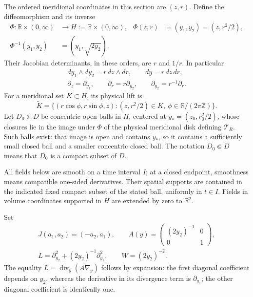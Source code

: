 The ordered meridional coordinates in this section are \((z,r)\).
Define the diffeomorphism and its inverse
\begin{align}
 \Phi:\mathbb R\times(0,\infty)&\longrightarrow
              H:=\mathbb R\times(0,\infty),
 &\Phi(z,r)&=(y_1,y_2)=(z,r^2/2),\label{eq:ec-Phi}\\
 \Phi^{-1}(y_1,y_2)&=(y_1,\sqrt{2y_2}).\nonumber
\end{align}
Their Jacobian determinants, in these orders, are \(r\) and \(1/r\).
In particular
\begin{gather*}
 dy_1\wedge dy_2=r\,dz\wedge dr,\qquad dy=r\,dz\,dr,\\
 \partial_z=\partial_{y_1},\qquad
 \partial_r=r\partial_{y_2},\qquad
 \partial_{y_2}=r^{-1}\partial_r.
\end{gather*}
For a meridional set \(K\subset H\), its physical lift is
\[
 \widetilde K=\{(r\cos\phi,r\sin\phi,z):
                 (z,r^2/2)\in K,\ \phi\in\mathbb R/(2\pi\mathbb Z)\}.
\]
Let \(D_0\Subset D\) be concentric open balls in \(H\), centered at
\(y_*=(z_0,r_0^2/2)\), whose closures lie in the image under \(\Phi\) of
the physical meridional disk defining \(\mathcal T_R\).  Such balls exist:
that image is open and contains \(y_*\), so it contains a sufficiently small
closed ball and a smaller concentric closed ball.  The notation
\(D_0\Subset D\) means that \(\overline{D_0}\) is a compact subset of \(D\).

All fields below are smooth on a time interval \(I\); at a closed endpoint,
smoothness means compatible one-sided derivatives.  Their spatial supports
are contained in the indicated fixed compact subset of the stated ball,
uniformly in \(t\in I\).  Fields in volume coordinates supported in \(H\)
are extended by zero to \(\mathbb R^2\).

Set
\begin{equation}
 \begin{gathered}
 J(a_1,a_2)=(-a_2,a_1),\qquad
 A(y)=\begin{pmatrix}(2y_2)^{-1}&0\\0&1\end{pmatrix},\\
 L=\partial_{y_2}^2+(2y_2)^{-1}\partial_{y_1}^2,
 \qquad W=(2y_2)^{-2}.
 \end{gathered}
 \label{eq:ec-coefficients}
\end{equation}
The equality \(L=\operatorname{div}_y(A\nabla_y)\) follows by expansion:
the first diagonal coefficient depends on \(y_2\), whereas the derivative
in its divergence term is \(\partial_{y_1}\); the other diagonal coefficient
is identically one.

